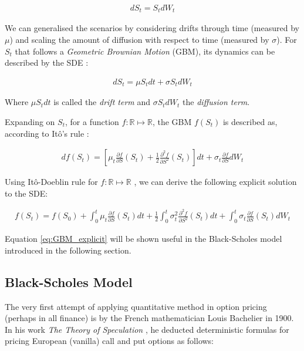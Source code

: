 \begin{align*}
dS_t = S_t dW_t
\end{align*}

We can generalised the scenarios by considering drifts through time (measured by $\mu$) and scaling the amount of diffusion with respect to time (measured by $\sigma$). For $S_t$ that follows a \textit{Geometric Brownian Motion} (GBM), its dynamics can be described by the SDE \cite{Shreve2004}:

\begin{align*}
dS_t = \mu S_t dt + \sigma S_t dW_t
\end{align*}

Where $\mu S_t dt$ is called the \textit{drift term} and $\sigma S_t dW_t$ the \textit{diffusion term}.

Expanding on $S_t$, for a function $f:\mathbb{R}\mapsto\mathbb{R}$, the GBM $f(S_t)$ is described as, according to Itô's rule \cite{Shreve2004}:

\begin{align*}
df(S_t) = \left[\mu_t\frac{\partial f}{\partial S}(S_t)+\frac{1}{2}\frac{\partial^2 f}{\partial S^2}(S_t)\right]dt + \sigma_t\frac{\partial f}{\partial S}dW_t
\end{align*}

Using Itô-Doeblin rule for $f:\mathbb{R}\mapsto\mathbb{R}$ \cite{Shreve2004}, we can derive the following explicit solution to the SDE:

\begin{align} \label{eq:GBM_explicit}
f(S_t) = f(S_0) + \int_{0}^{t}{\mu_t\frac{\partial f}{\partial S}(S_t)}dt + \frac{1}{2}\int_{0}^{t}{\sigma_t^2\frac{\partial^2 f}{\partial S^2}(S_t)}dt + \int_{0}^{t}{\sigma_t\frac{\partial f}{\partial S}(S_t)}dW_t
\end{align}

Equation \ref{eq:GBM_explicit} will be shown useful in the Black-Scholes model introduced in the following section.

\subsection{Black-Scholes Model}

The very first attempt of applying quantitative method in option pricing (perhaps in all finance) is by the French mathematician Louis Bachelier in 1900. In his work \textit{The Theory of Speculation} \cite{Bachelier1900}, he deducted deterministic formulas for pricing European (vanilla) call and put options as follows:

